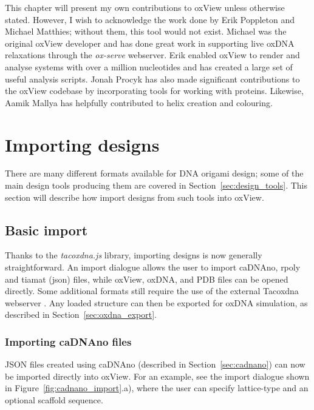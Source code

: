 This chapter will present my own contributions to oxView \cite{poppleton2020design, bohlin2022oxview} unless otherwise stated. However, I wish to acknowledge the work done by Erik Poppleton and Michael Matthies; without them, this tool would not exist. Michael was the original oxView developer and has done great work in supporting live oxDNA relaxations through the \emph{ox-serve} webserver. Erik enabled oxView to render and analyse systems with over a million nucleotides and has created a large set of useful analysis scripts. Jonah Procyk has also made significant contributions to the oxView codebase by incorporating tools for working with proteins. Likewise, Aamik Mallya has helpfully contributed to helix creation and colouring.

\section{Importing designs}
\label{sec:importing_designs}
There are many different formats available for DNA origami design; some of the main design tools producing them are covered in Section~\ref{sec:design_tools}. This section will describe how import designs from such tools into oxView.

\subsection{Basic import}
Thanks to the \emph{tacoxdna.js} library, importing designs is now generally straightforward. An import dialogue allows the user to import caDNAno, rpoly and tiamat (json) files, while oxView, oxDNA, and PDB files can be opened directly. Some additional formats still require the use of the external Tacoxdna webserver \cite{taco}. Any loaded structure can then be exported for oxDNA simulation, as described in Section~\ref{sec:oxdna_export}.

\subsubsection{Importing caDNAno files}
JSON files created using caDNAno (described in Section~\ref{sec:cadnano}) can now be imported directly into oxView. For an example, see the import dialogue shown in Figure~\ref{fig:cadnano_import}.a), where the user can specify lattice-type and an optional scaffold sequence.

